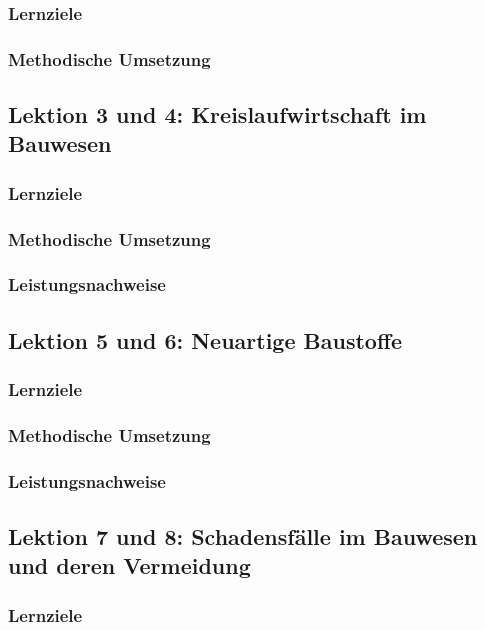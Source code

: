 \documentclass[
11pt,
captions=tableheading,
smallheadings,
headsepline,
footsepline, 
captions=tableheading,
parskip=half-,
]{scrartcl}
\begin{document}
\subsubsection{Lernziele}
\subsubsection{Methodische Umsetzung}





\subsection{Lektion 3 und 4: Kreislaufwirtschaft im Bauwesen}
\subsubsection{Lernziele}
\subsubsection{Methodische Umsetzung}
\subsubsection{Leistungsnachweise}




\subsection{Lektion 5 und 6: Neuartige Baustoffe}
\subsubsection{Lernziele}
\subsubsection{Methodische Umsetzung}
\subsubsection{Leistungsnachweise}




\subsection{Lektion 7 und 8: Schadensfälle im Bauwesen und deren Vermeidung}
\subsubsection{Lernziele}
\end{document}
